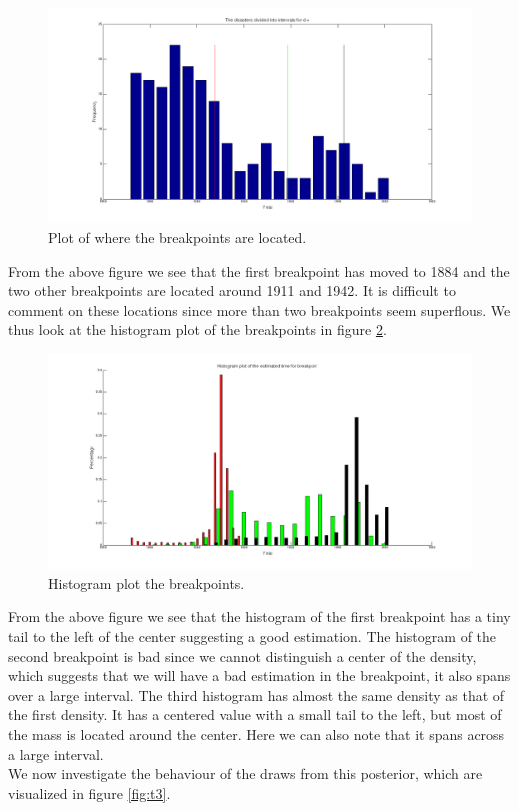 \begin{figure}[H]
\centering
\includegraphics[scale=0.26]{./Figures/bp3.png}
\caption{Plot of where the breakpoints are located.}
\label{fig:bp3}
\end{figure}

From the above figure we see that the first breakpoint has moved to 1884 and the two other breakpoints are located around 1911 and 1942. It is difficult to comment on these locations since more than two breakpoints seem superflous. We thus look at the histogram plot of the breakpoints in figure \ref{fig:tpost3}.

\begin{figure}[H]
\centering
\includegraphics[scale=0.26]{./Figures/tpost3.png}
\caption{Histogram plot the breakpoints.}
\label{fig:tpost3}
\end{figure}

From the above figure we see that the histogram of the first breakpoint has a tiny tail to the left of the center suggesting a good estimation. The histogram of the second breakpoint is bad since we cannot distinguish a center of the density, which suggests that we will have a bad estimation in the breakpoint, it also spans over a large interval. The third histogram has almost the same density as that of the first density. It has a centered value with a small tail to the left, but most of the mass is located around the center. Here we can also note that it spans across a large interval. \\ We now investigate the behaviour of the draws from this posterior, which are visualized in figure \ref{fig:t3}.

